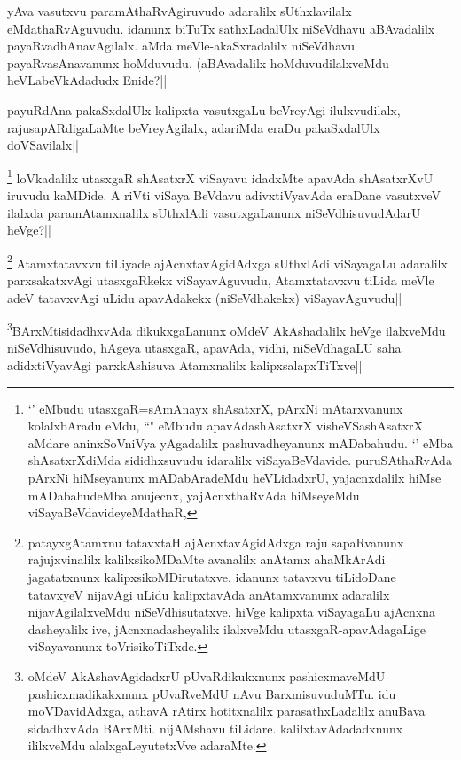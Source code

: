 
\begin{artha}
yAva vasutxvu paramAthaRvAgiruvudo adaralilx sUthxlavilalx eMdathaRvAguvudu. idanunx biTuTx sathxLadalUlx niSeVdhavu aBAvadalilx payaRvadhAnavAgilalx. aMda meVle-akaSxradalilx niSeVdhavu payaRvasAnavanunx hoMduvudu. (aBAvadalilx hoMduvudilalxveMdu heVLabeVkAdadudx Enide?||
\end{artha}

\begin{artha}%
payuRdAna pakaSxdalUlx kalipxta vasutxgaLu beVreyAgi ilulxvudilalx, rajusapARdigaLaMte beVreyAgilalx, adariMda eraDu pakaSxdalUlx doVSavilalx||
\end{artha}


\begin{artha}
\footnote[1]{`\stext ' eMbudu utasxgaR=sAmAnayx shAsatxrX, pArxNi mAtarxvanunx kolalxbAradu eMdu, ``\stext " eMbudu apavAdashAsatxrX visheVSashAsatxrX aMdare aninxSoVniVya yAgadalilx pashuvadheyanunx mADabahudu. `\stext ' eMba shAsatxrXdiMda sididhxsuvudu idaralilx viSayaBeVdavide. puruSAthaRvAda pArxNi hiMseyanunx mADabAradeMdu heVLidadxrU, yajacnxdalilx hiMse mADabahudeMba anujecnx, yajAcnxthaRvAda hiMseyeMdu viSayaBeVdavideyeMdathaR,} loVkadalilx utasxgaR shAsatxrX viSayavu idadxMte apavAda shAsatxrXvU iruvudu kaMDide. A riVti viSaya BeVdavu adivxtiVyavAda  eraDane vasutxveV ilalxda paramAtamxnalilx sUthxlAdi vasutxgaLanunx niSeVdhisuvudAdarU heVge?||
\end{artha}

\begin{artha}
\footnote[2]{patayxgAtamxnu tatavxtaH ajAcnxtavAgidAdxga raju sapaRvanunx rajujxvinalilx kalilxsikoMDaMte avanalilx anAtamx ahaMkArAdi jagatatxnunx kalipxsikoMDirutatxve. idanunx tatavxvu tiLidoDane tatavxyeV nijavAgi uLidu kalipxtavAda anAtamxvanunx adaralilx nijavAgilalxveMdu niSeVdhisutatxve. hiVge kalipxta viSayagaLu ajAcnxna dasheyalilx ive, jAcnxnadasheyalilx ilalxveMdu utasxgaR-apavAdagaLige viSayavanunx toVrisikoTiTxde.} Atamxtatavxvu tiLiyade ajAcnxtavAgidAdxga sUthxlAdi viSayagaLu adaralilx parxsakatxvAgi utasxgaRkekx viSayavAguvudu, Atamxtatavxvu tiLida meVle adeV tatavxvAgi uLidu apavAdakekx (niSeVdhakekx) viSayavAguvudu||
\end{artha}

\begin{artha}%
\footnote[1]{oMdeV AkAshavAgidadxrU pUvaRdikukxnunx pashicxmaveMdU pashicxmadikakxnunx pUvaRveMdU nAvu BarxmisuvuduMTu. idu moVDavidAdxga, athavA rAtirx hotitxnalilx parasathxLadalilx anuBava sidadhxvAda BArxMti. nijAMshavu tiLidare. kalilxtavAdadadxnunx ililxveMdu alalxgaLeyutetxVve adaraMte.}BArxMtisidadhxvAda dikukxgaLanunx oMdeV AkAshadalilx heVge ilalxveMdu niSeVdhisuvudo, hAgeya utasxgaR, apavAda, vidhi, niSeVdhagaLU saha adidxtiVyavAgi parxkAshisuva Atamxnalilx kalipxsalapxTiTxve||
\end{artha}

